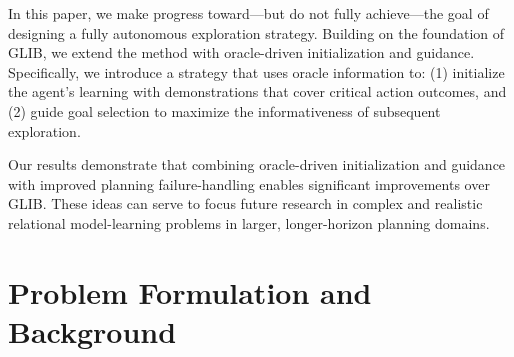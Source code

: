 


In this paper, we make progress toward—but do not fully achieve—the goal of designing a fully autonomous exploration strategy. Building on the foundation of GLIB, we extend the method with oracle-driven initialization and guidance. Specifically, we introduce a strategy that uses oracle information to: (1) initialize the agent’s learning with demonstrations that cover critical action outcomes, and (2) guide goal selection to maximize the informativeness of subsequent exploration.

Our results demonstrate that combining oracle-driven initialization and guidance with improved planning failure-handling enables significant improvements over GLIB. These ideas can serve to focus future research in complex and realistic relational model-learning problems in larger, longer-horizon planning domains.


\section{Problem Formulation and Background}
\label{sec:background}


